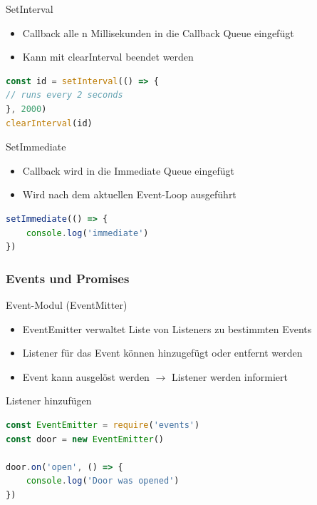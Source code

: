 \begin{code}{SetInterval}
\begin{itemize}
  \item Callback alle n Millisekunden in die Callback Queue eingefügt
  \item Kann mit clearInterval beendet werden
\end{itemize}
\begin{lstlisting}[language=JavaScript, style=basesmol]
const id = setInterval(() => {
// runs every 2 seconds
}, 2000)
clearInterval(id)
\end{lstlisting}
\end{code}

\begin{code}{SetImmediate}
\begin{itemize}
  \item Callback wird in die Immediate Queue eingefügt
  \item Wird nach dem aktuellen Event-Loop ausgeführt
\end{itemize}
\begin{lstlisting}[language=JavaScript, style=basesmol]
setImmediate(() => {
    console.log('immediate')
})
\end{lstlisting}
\end{code}

\subsubsection{Events und Promises}

\begin{definition}{Event-Modul (EventMitter)}
\begin{itemize}
  \item EventEmitter verwaltet Liste von Listeners zu bestimmten Events
  \item Listener für das Event können hinzugefügt oder entfernt werden
  \item Event kann ausgelöst werden $\rightarrow$ Listener werden informiert
\end{itemize}
\end{definition}

\begin{examplecode}{Listener hinzufügen}
\begin{lstlisting}[language=JavaScript, style=basesmol]
const EventEmitter = require('events')
const door = new EventEmitter()

door.on('open', () => {
    console.log('Door was opened')
})
\end{lstlisting}
\end{examplecode}

